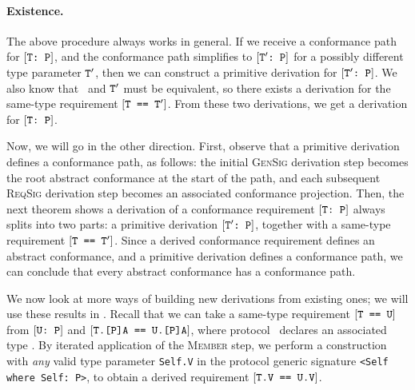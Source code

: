 \documentclass[../generics]{subfiles}
\begin{document}
\paragraph{Existence.} The above procedure always works in general. If we receive a conformance path for $[\texttt{T:~P}]$, and the conformance path simplifies to $[\texttt{$\texttt{T}^\prime$:~P}]$ for a possibly different type parameter $\texttt{T}^\prime$,
then we can construct a primitive derivation for $[\texttt{$\texttt{T}^\prime$:~P}]$. We also know that \tT\ and $\texttt{T}^\prime$ must be equivalent, so there exists a derivation for the same-type requirement $[\texttt{T == $\texttt{T}^\prime$}]$. From these two derivations, we get a derivation for $[\texttt{T:~P}]$.

Now, we will go in the other direction. First, observe that a primitive derivation defines a conformance path, as follows: the initial \textsc{GenSig} derivation step becomes the root abstract conformance at the start of the path, and each subsequent \textsc{ReqSig} derivation step becomes an associated conformance projection. Then, the next theorem shows a derivation of a conformance requirement $[\texttt{T:~P}]$ always splits into two parts: a primitive derivation $[\texttt{$\texttt{T}^\prime$:~P}]$, together with a same-type requirement $[\texttt{T == $\texttt{T}^\prime$}]$. Since a derived conformance requirement defines an abstract conformance, and a primitive derivation defines a conformance path, we can conclude that every abstract conformance has a conformance path. 

We now look at more ways of building new derivations from existing ones; we will use these results in . Recall that we can take a same-type requirement $[\texttt{T == U}]$ from $[\texttt{U:~P}]$ and $[\texttt{T.[P]A == U.[P]A}]$, where protocol \tP\ declares an associated type \nA. By iterated application of the \textsc{Member} step, we perform a construction with \emph{any} valid type parameter \texttt{Self.V} in the protocol generic signature \verb|<Self where Self: P>|, to obtain a derived requirement $[\texttt{T.V == U.V}]$.
\end{document}

